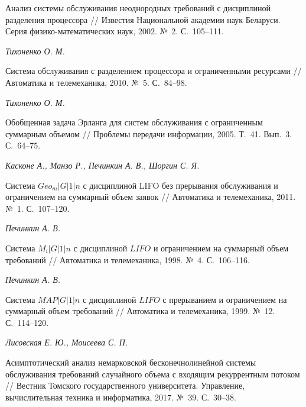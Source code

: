 \documentclass[a4paper,12pt]{article}
\begin{document}
\begin{enumerate}
Анализ системы обслуживания неоднородных требований с дисциплиной разделения процессора // {Известия Национальной академии наук Беларуси. Серия физико-математических наук}, 2002. №~2. С.~105--111.





\textit{Тихоненко О. М.}

Система обслуживания с разделением процессора и ограниченными ресурсами // {Автоматика и телемеханика}, 2010. №~5. С.~84--98.





\textit{Тихоненко О. М.}

Обобщенная задача Эрланга для систем обслуживания с ограниченным суммарным объемом // {Проблемы передачи информации}, 2005. Т.~41. Вып.~3. С.~64--75.





\textit{Касконе А., Манзо Р., Печинкин А. В., Шоргин С. Я.}

Система $Geo_m|G|1|n$ с дисциплиной LIFO без прерывания обслуживания и ограничением на суммарный объем заявок // {Автоматика и телемеханика}, 2011. №~1. С.~107--120.





\textit{Печинкин А. В.}

Система $M_i|G|1|n$ с дисциплиной $LIFO$ и ограничением на суммарный объем требований // {Автоматика и телемеханика}, 1998. №~4. С.~106--116.





\textit{Печинкин А. В.}

Система $MAP|G|1|n$ с дисциплиной $LIFO$ с прерыванием и ограничением на суммарный объем требований // {Автоматика и телемеханика}, 1999. №~12. С.~114--120.





\textit{Лисовская Е. Ю., Моисеева С. П.}

Асимптотический анализ немарковской бесконечнолинейной системы обслуживания требований случайного объема с входящим рекуррентным потоком // {Вестник Томского государственного университета. Управление, вычислительная техника и информатика}, 2017. №~39. С.~30--38.




\end{enumerate}
\end{document}
